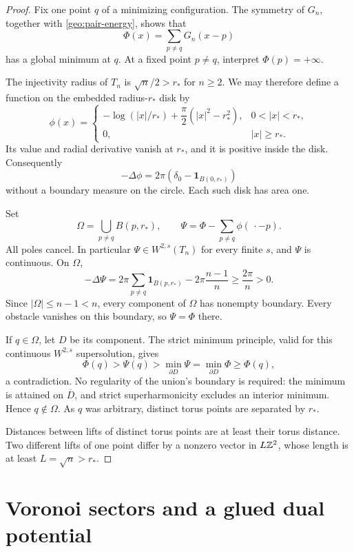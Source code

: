 \begin{proof}
Fix one point \(q\) of a minimizing configuration.  The symmetry of
\(G_n\), together with \eqref{geo:pair-energy}, shows that
\[
 \Phi(x)=\sum_{p\ne q}G_n(x-p)
\]
has a global minimum at \(q\).  At a fixed point \(p\ne q\), interpret
\(\Phi(p)=+\infty\).

The injectivity radius of \(T_n\) is \(\sqrt n/2>r_*\) for \(n\geq2\).
We may therefore define a function on the embedded radius-\(r_*\)
disk by
\[
 \phi(x)=
 \begin{cases}
 -\log(|x|/r_*)+\dfrac{\pi}{2}(|x|^2-r_*^2),
       &0<|x|<r_*,\\[3pt]
 0,&|x|\geq r_*.
 \end{cases}
\]
Its value and radial derivative vanish at \(r_*\), and it is
positive inside the disk.  Consequently
\[
 -\Delta\phi=2\pi(\delta_0-\mathbf1_{B(0,r_*)})
\]
without a boundary measure on the circle.  Each such disk has area
one.

Set
\[
 \Omega=\bigcup_{p\ne q}B(p,r_*),\qquad
 \Psi=\Phi-\sum_{p\ne q}\phi(\,\cdot-p).
\]
All poles cancel.  In particular \(\Psi\in W^{2,s}(T_n)\) for every
finite \(s\), and \(\Psi\) is continuous.  On \(\Omega\),
\[
 -\Delta\Psi
 =2\pi\sum_{p\ne q}\mathbf1_{B(p,r_*)}
      -2\pi\frac{n-1}{n}
 \geq \frac{2\pi}{n}>0.
\]
Since \(|\Omega|\leq n-1<n\), every component of \(\Omega\) has
nonempty boundary.  Every obstacle vanishes on this boundary, so
\(\Psi=\Phi\) there.

If \(q\in\Omega\), let \(D\) be its component.  The strict minimum
principle, valid for this continuous \(W^{2,s}\) supersolution,
gives
\[
 \Phi(q)>\Psi(q)>
       \min_{\partial D}\Psi
       =\min_{\partial D}\Phi\geq\Phi(q),
\]
a contradiction.  No regularity of the union's boundary is required:
the minimum is attained on \(\overline D\), and strict
superharmonicity excludes an interior minimum.  Hence
\(q\notin\Omega\).  As \(q\) was arbitrary, distinct torus points
are separated by \(r_*\).

Distances between lifts of distinct torus points are at least
their torus distance.  Two different lifts of one point differ by
a nonzero vector in \(L\mathbb Z^2\), whose length is at least
\(L=\sqrt n>r_*\).
\end{proof}

\section{Voronoi sectors and a glued dual potential}
\label{dual:section}

